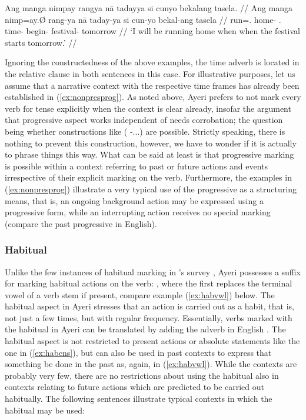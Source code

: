\a\label{ex:futprog}\begingl
	\gla Ang manga nimpay rangya nā tadayya si cunyo bekalang tasela. //
	\glb Ang manga nimp=ay.Ø rang-ya nā taday-ya si cun-yo bekal-ang 
		tasela //
	\glc \AgtT{} \Prog{} run=\Fsg{}.\Top{} home-\Loc{} \Fsg{}.\Gen{} 
		time-\Loc{} \Rel{} begin-\TsgN{} festival-\Aarg{} tomorrow //
	\glft `I will be running home when when the festival starts 
		tomorrow.' //
\endgl

\xe

Ignoring the constructedness of the above examples, the time adverb is located 
in the relative clause in both sentences in this case. For illustrative 
purposes, let us assume that a narrative context with the respective time 
frames has already been established in (\ref{ex:nonpresprog}). As noted above, 
Ayeri prefers to not mark every verb for tense explicitly when the context is 
clear already, insofar the argument that progressive aspect works independent 
of  needs corrobation; the question being whether constructions like 
 (\Prog{} \Pst{}-...) are possible. Strictly 
speaking, there is nothing to prevent this construction, however, we have to 
wonder if it is actually  to phrase things this way. What can be 
said at least is that progressive marking is possible within a context 
referring to past or future actions and events irrespective of their explicit 
marking on the verb. Furthermore, the examples in (\ref{ex:nonpresprog}) 
illustrate a very typical use of the progressive as a structuring means, that 
is, an ongoing background action may be expressed using a progressive form, 
while an interrupting action receives no special marking (compare the past 
progressive in English).


\subsubsection{Habitual}

Unlike the few instances of habitual marking in \citeauthor{dahl1985}'s survey 
\citep[96]{dahl1985}, Ayeri possesses a suffix for marking habitual actions on 
the verb: , where the first  replaces the terminal vowel 
of a verb stem if present, compare example (\ref{ex:habvwl}) below. The 
habitual aspect in Ayeri stresses that an action is carried out as a habit, that 
is, not just a few times, but with regular frequency. Essentially, verbs marked 
with the habitual in Ayeri can be translated by adding the adverb  
in English \citep[97]{dahl1985}. The habitual aspect is not restricted to 
present actions or absolute statements like the one in (\ref{ex:habcns}), but 
can also be used in past contexts to express that something  be done 
in the past as, again, in (\ref{ex:habvwl}). While the contexts are probably 
very few, there are no restrictions about using the habitual also in contexts 
relating to future actions which are predicted to be carried out habitually. The 
following sentences illustrate typical contexts in which the habitual may be 
used:

